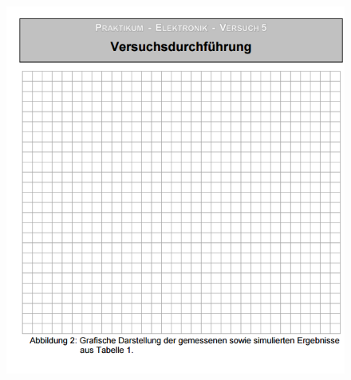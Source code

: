 \begin{figure}[!h]
\begin{center}
\includegraphics[scale=0.8]{Graph1}
\end{center}
\end{figure}
\clearpage
